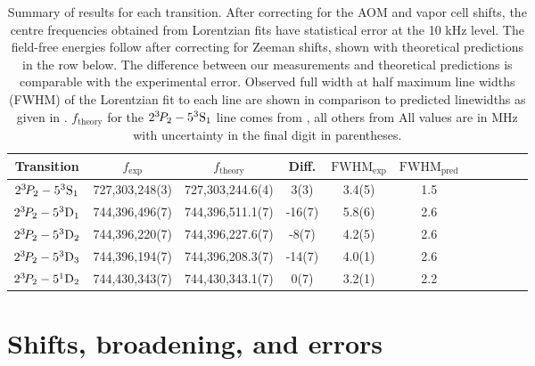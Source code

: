 \begin{table}
    \begin{tabular}{c c c c c c c c c c c}
      \hline\hline
      Transition                        &  $f_\textrm{exp}$ &  $f_\textrm{theory}$ & Diff.
		  &  $\textrm{FWHM}_{\textrm{exp}}$  &  $\textrm{FWHM}_{{\textrm{pred}}}$ \\
      \hline
        $2^{3\!} P_2 - 5^3\mathrm{S}_1$ &  {727,303,248(3)} &   727,303,244.6(4)   &  {3(3)}      &  3.4(5)  &  1.5\\ %
        $2^{3\!} P_2 - 5^3\mathrm{D}_1$ &  {744,396,496(7)} &   744,396,511.1(7)   &  {-16(7)}     &  5.8(6)  &  2.6\\
        $2^{3\!} P_2 - 5^3\mathrm{D}_2$ &  {744,396,220(7)} &   744,396,227.6(7)   &  {-8(7)}      &  4.2(5)  &  2.6\\
        $2^{3\!} P_2 - 5^3\mathrm{D}_3$ &  {744,396,194(7)} &   744,396,208.3(7)   &  {-14(7)}     &  4.0(1)  &  2.6\\
        $2^{3\!} P_2 - 5^1\mathrm{D}_2$ &  {744,430,343(7)} &   744,430,343.1(7)   &  {0(7)}      &  3.2(1)  &  2.2\\  %
      \hline\hline
    \end{tabular}
\caption{Summary of results for each transition.
	After correcting for the AOM and vapor cell shifts, the centre frequencies obtained from Lorentzian fits have statistical error at the 10 kHz level.
	The field-free energies follow after correcting for Zeeman shifts, shown with theoretical predictions in the row below.
	The difference between our measurements and theoretical predictions is comparable with the experimental error.
	Observed full width at half maximum line widths (FWHM) of the Lorentzian fit to each line are shown in comparison to predicted linewidths as given in \cite{Drake07}.
	$f_\textrm{theory}$ for the $2^{3\!} P_2 - 5^3\mathrm{S}_1$ line comes from \cite{Drake07}, all others from \cite{Yerokhin20}
	All values are in MHz with uncertainty in the final digit in parentheses.}
  \label{tab:spec_results}
\end{table}

\section{Shifts, broadening, and errors}





